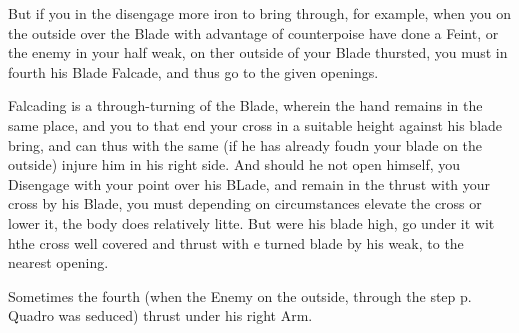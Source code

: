But if you in the disengage more iron to bring through, for example,
when you on the outside over the Blade with advantage of
counterpoise have done a Feint, or the enemy in your half weak, on
ther outside of your Blade thursted, you must in fourth his Blade
Falcade, and thus go to the given openings.


Falcading is a through-turning of the Blade, wherein the hand remains
in the same place, and you to that end your cross in a suitable height
against his blade bring, and can thus with the same (if he has already
foudn your blade on the outside) injure him in his right side. And
should he not open himself, you Disengage with your point over his
BLade, and remain in the thrust with your cross by his Blade, you must
depending on circumstances elevate the cross or lower it, the body
does relatively litte. But were his blade high, go under it wit hthe
cross well covered and thrust with e turned blade by his weak, to the
nearest opening.


Sometimes the fourth (when the Enemy on the outside, through the step
p. Quadro was seduced) thrust under his right Arm.


